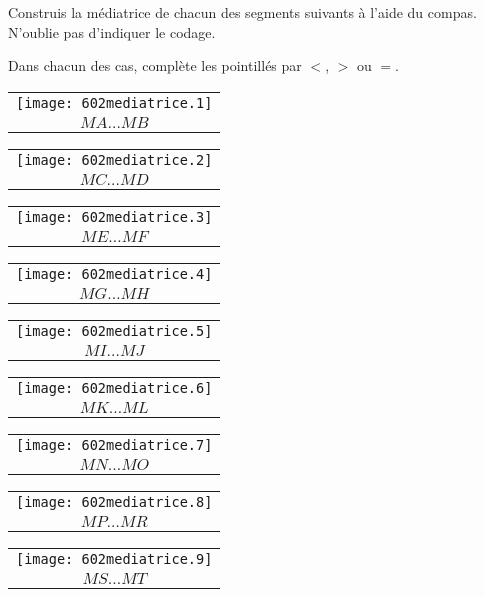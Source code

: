\begin{myenumerate}
\item Construis la médiatrice de chacun des segments suivants à l'aide du compas. N'oublie pas d'indiquer le codage.
\item Dans chacun des cas, complète les pointillés par $<$, $>$ ou $=$.
\end{myenumerate}
\par
\begin{tabular}{c}
\texttt{[image: 602mediatrice.1]}\\
$MA\ldots MB$\\
\end{tabular}
\hfill
\begin{tabular}{c}
\texttt{[image: 602mediatrice.2]}\\
$MC\ldots MD$\\
\end{tabular}
\hfill
\begin{tabular}{c}
\texttt{[image: 602mediatrice.3]}\\
$ME\ldots MF$\\
\end{tabular}
\par
\begin{tabular}{c}
\texttt{[image: 602mediatrice.4]}\\
$MG\ldots MH$\\
\end{tabular}
\hfill
\begin{tabular}{c}
\texttt{[image: 602mediatrice.5]}\\
$MI\ldots MJ$\\
\end{tabular}
\hfill
\begin{tabular}{c}
\texttt{[image: 602mediatrice.6]}\\
$MK\ldots ML$\\
\end{tabular}
\par
\begin{tabular}{c}
\texttt{[image: 602mediatrice.7]}\\
$MN\ldots MO$\\
\end{tabular}
\hfill
\begin{tabular}{c}
\texttt{[image: 602mediatrice.8]}\\
$MP\ldots MR$\\
\end{tabular}
\hfill
\begin{tabular}{c}
\texttt{[image: 602mediatrice.9]}\\
$MS\ldots MT$\\
\end{tabular}

